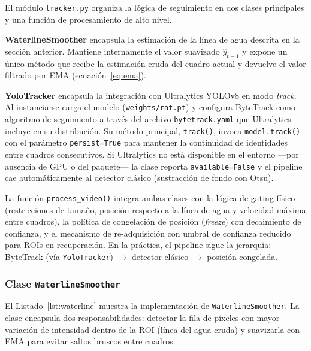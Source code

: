El módulo \texttt{tracker.py} organiza la lógica de seguimiento en dos clases
principales y una función de procesamiento de alto nivel.

\textbf{WaterlineSmoother} encapsula la estimación de la línea de agua descrita en la
sección anterior. Mantiene internamente el valor suavizado $\hat{y}_{t-1}$ y expone un
único método que recibe la estimación cruda del cuadro actual y devuelve el valor
filtrado por EMA (ecuación~\ref{eq:ema}).

\textbf{YoloTracker} encapsula la integración con Ultralytics YOLOv8 en modo
\textit{track}. Al instanciarse carga el modelo (\texttt{weights/rat.pt}) y configura
ByteTrack \cite{zhang2022_bytetrack} como algoritmo de seguimiento a través del
archivo \texttt{bytetrack.yaml} que Ultralytics incluye en su distribución. Su método
principal, \texttt{track()}, invoca \texttt{model.track()} con el parámetro
\texttt{persist=True} para mantener la continuidad de identidades entre cuadros
consecutivos. Si Ultralytics no está disponible en el entorno ---por ausencia de GPU o
del paquete--- la clase reporta \texttt{available=False} y el pipeline cae
automáticamente al detector clásico (sustracción de fondo con Otsu).

La función \texttt{process\_video()} integra ambas clases con la lógica de gating
físico (restricciones de tamaño, posición respecto a la línea de agua y velocidad
máxima entre cuadros), la política de congelación de posición (\textit{freeze}) con
decaimiento de confianza, y el mecanismo de re-adquisición con umbral de confianza
reducido para ROIs en recuperación. En la práctica, el pipeline sigue la jerarquía:
ByteTrack (vía \texttt{YoloTracker})
$\rightarrow$ detector clásico
$\rightarrow$ posición congelada.


\subsubsection{Clase \texttt{WaterlineSmoother}}

El Listado~\ref{lst:waterline} muestra la implementación de
\texttt{WaterlineSmoother}. La clase encapsula dos responsabilidades: detectar
la fila de píxeles con mayor variación de intensidad dentro de la ROI (línea
del agua cruda) y suavizarla con EMA para evitar saltos bruscos entre cuadros.

